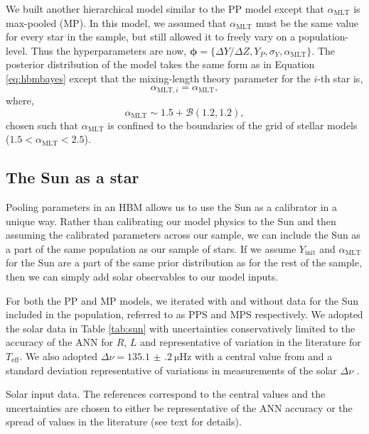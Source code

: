 \documentclass[fleqn,usenatbib]{mnras}
\newcommand{\dnu}{\ensuremath{\Delta\nu}}
\newcommand{\teff}{\ensuremath{T_\mathrm{eff}}}
\newcommand{\mlt}{\ensuremath{{\alpha_\mathrm{MLT}}}}
\begin{document}
We built another hierarchical model similar to the PP model except that $\mlt$ is max-pooled (MP). In this model, we assumed that $\mlt$ must be the same value for every star in the sample, but still allowed it to freely vary on a population-level. Thus the hyperparameters are now, $\boldsymbol{\phi} = \{\Delta Y/\Delta Z, Y_P, \sigma_Y, \mlt\}$. The posterior distribution of the model takes the same form as in Equation \ref{eq:hbmbayes} except that the mixing-length theory parameter for the $i$-th star is,
%
\begin{equation}
    \alpha_{\mathrm{MLT}, i} = \mlt,
\end{equation}
%
where,
\begin{equation}
    \mlt \sim 1.5 + \mathcal{B}(1.2, 1.2),
\end{equation}
%
chosen such that $\mlt$ is confined to the boundaries of the grid of stellar models ($1.5 < \mlt < 2.5$).

\subsection{The Sun as a star}\label{sec:sun}

Pooling parameters in an HBM allows us to use the Sun as a calibrator in a unique way. Rather than calibrating our model physics to the Sun and then assuming the calibrated parameters across our sample, we can include the Sun as a part of the same population as our sample of stars. If we assume $Y_\mathrm{init}$ and $\mlt$ for the Sun are a part of the same prior distribution as for the rest of the sample, then we can simply add solar observables to our model inputs.

For both the PP and MP models, we iterated with and without data for the Sun included in the population, referred to as PPS and MPS respectively. We adopted the solar data in Table \ref{tab:sun} with uncertainties conservatively limited to the accuracy of the ANN for $R$, $L$ and representative of variation in the literature for $\teff$. We also adopted $\dnu=\SI{135.1(2)}{\micro\hertz}$ with a central value from \citet{Huber.Bedding.ea2011} and a standard deviation representative of variations in measurements of the solar $\dnu$ \citep{Broomhall.Chaplin.ea2011}.

\begin{table}
    \centering
    \caption{Solar input data. The references correspond to the central values and the uncertainties are chosen to either be representative of the ANN accuracy or the spread of values in the literature (see text for details).}
    \label{tab:sun}
    
\end{table}
\end{document}
